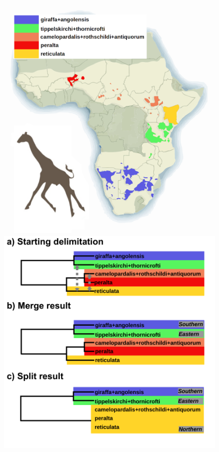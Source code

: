 \documentclass{article1}
\begin{document}
\begin{figure}[h]
    \centering %
    \includegraphics[scale=0.50]{figs/Giraffe/giraffe_fig} %
    \includegraphics[scale=0.50]{figs/Giraffe/giraffe_result}  %
    

\end{figure}
\end{document}
